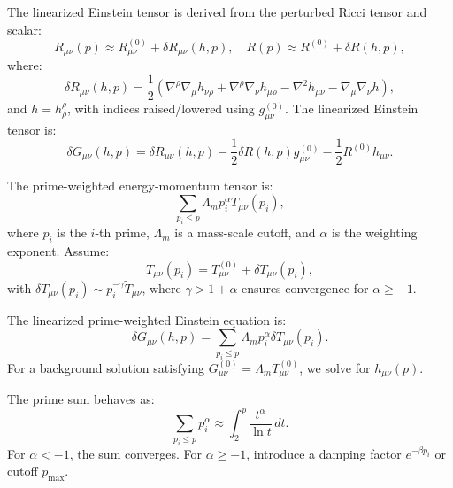 \documentclass[12pt]{article}
\theoremstyle{plain}
\begin{document}
The linearized Einstein tensor is derived from the perturbed Ricci tensor and scalar:
\begin{equation}
R_{\mu\nu}(p) \approx R_{\mu\nu}^{(0)} + \delta R_{\mu\nu}(h, p), \quad R(p) \approx R^{(0)} + \delta R(h, p),
\end{equation}
where:
\begin{equation}
\delta R_{\mu\nu}(h, p) = \frac{1}{2} \left( \nabla^{\rho} \nabla_{\mu} h_{\nu\rho} + \nabla^{\rho} \nabla_{\nu} h_{\mu\rho} - \nabla^{2} h_{\mu\nu} - \nabla_{\mu} \nabla_{\nu} h \right),
\end{equation}
and \( h = h^{\rho}_{\rho} \), with indices raised/lowered using \( g_{\mu\nu}^{(0)} \). The linearized Einstein tensor is:
\begin{equation}
\delta G_{\mu\nu}(h, p) = \delta R_{\mu\nu}(h, p) - \frac{1}{2} \delta R(h, p) g_{\mu\nu}^{(0)} - \frac{1}{2} R^{(0)} h_{\mu\nu}.
\end{equation}

The prime-weighted energy-momentum tensor is:
\begin{equation}
\sum_{p_i \leq p} \Lambda_m p_i^{\alpha} T_{\mu\nu}(p_i),
\end{equation}
where \( p_i \) is the \( i \)-th prime, \( \Lambda_m \) is a mass-scale cutoff, and \( \alpha \) is the weighting exponent. Assume:
\begin{equation}
T_{\mu\nu}(p_i) = T_{\mu\nu}^{(0)} + \delta T_{\mu\nu}(p_i),
\end{equation}
with \( \delta T_{\mu\nu}(p_i) \sim p_i^{-\gamma} \tilde{T}_{\mu\nu} \), where \( \gamma > 1 + \alpha \) ensures convergence for \( \alpha \geq -1 \).

The linearized prime-weighted Einstein equation is:
\begin{equation}
\delta G_{\mu\nu}(h, p) = \sum_{p_i \leq p} \Lambda_m p_i^{\alpha} \delta T_{\mu\nu}(p_i).
\end{equation}
For a background solution satisfying \( G_{\mu\nu}^{(0)} = \Lambda_m T_{\mu\nu}^{(0)} \), we solve for \( h_{\mu\nu}(p) \).

The prime sum behaves as:
\begin{equation}
\sum_{p_i \leq p} p_i^{\alpha} \approx \int_{2}^{p} \frac{t^{\alpha}}{\ln t} \, dt.
\end{equation}
For \( \alpha < -1 \), the sum converges. For \( \alpha \geq -1 \), introduce a damping factor \( e^{-\beta p_i} \) or cutoff \( p_{\text{max}} \).
\end{document}
